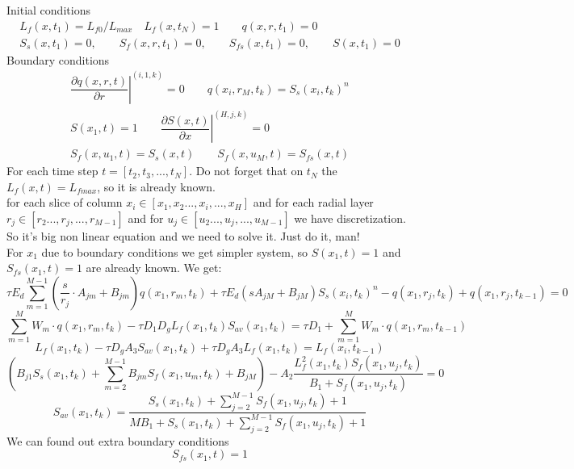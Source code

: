\documentclass[12pt]{article}
\begin{document}
Initial conditions
\begin{equation}
	\begin{array}{c}
	L_f(x, t_1) = L_{f0}/L_{max} \quad L_f(x, t_N) = 1 \qquad q(x, r, t_1) = 0\\
	S_s(x,t_1) = 0, \qquad S_f(x, r, t_1) = 0,\qquad S_{fs}(x,t_1) = 0,\qquad S(x,t_1) = 0
	\end{array}
\end{equation}
Boundary conditions
\begin{equation}
\begin{array}{c}
\left.\dfrac{\partial q(x,r,t)}{\partial r}\right\vert^{(i, 1, k)}=0 \qquad q(x_i, r_M, t_k) = S_s(x_i, t_k)^n\\
S(x_1, t) = 1 \qquad \left.\dfrac{\partial S(x,t)}{\partial x}\right\vert^{(H, j, k)}=0\\
S_f(x,u_1,t) = S_s(x, t) \qquad S_f(x,u_M,t) = S_{fs}(x, t)
\end{array}
\end{equation}
For each time step $t = [t_2, t_3, ..., t_N]$. Do not forget that on $t_N$ the $L_f(x,t)=L_{fmax}$, so it is already known.\\	
for each slice of column $x_i \in [x_1, x_2 ..., x_i, ..., x_H]$ and for each radial layer  $r_j \in [r_2 ..., r_j, ..., r_{M-1}]$ and for $u_j \in [u_2 ..., u_j, ..., u_{M-1}]$ we have discretization. So it's big non linear equation and we need to solve it. Just do it, man!\\
For $x_1$ due to boundary conditions we get simpler system, so $S(x_1, t)=1$ and $S_{fs}(x_1, t)=1$ are already known. We get:
\begin{equation}
\tau E_d\sum_{m=1}^{M-1} \left(\dfrac{s}{r_j} \cdot A_{jm} + B_{jm} \right) q(x_1,r_m,t_{k})  +\tau E_d\left(sA_{jM} + B_{jM} \right)S_s(x_i, t_k)^n - q(x_1,r_j,t_{k}) + q(x_1,r_j,t_{k-1})  = 0
\end{equation}
\begin{equation}
\sum_{m=1}^{M} W_m \cdot q(x_1,r_m,t_k)-\tau D_1D_gL_f(x_1,t_k)S_{av}(x_1, t_k) =
\tau D_1 + \sum_{m=1}^{M} W_m \cdot q(x_1,r_m,t_{k-1})
\end{equation}
\begin{equation}
L_f(x_1,t_k)-\tau D_gA_3S_{av}(x_1, t_k)+\tau D_gA_3L_f{(x_1,t_k)}=
L_f(x_i,t_{k-1})
\end{equation}
\begin{equation}
\left(B_{j1}S_s(x_1, t_k) + \sum_{m=2}^{M-1}B_{jm}S_f(x_1,u_m,t_k)+B_{jM}\right)-A_2\frac{L_f^2(x_1,t_k)S_f(x_1,u_j,t_k)}{B_1+S_f(x_1,u_j,t_k)}=0
\end{equation}
\begin{equation}
S_{av}(x_1,t_k) = 
\frac{S_s(x_1, t_k)+\sum_{j=2}^{M-1}S_f(x_1, u_j, t_k)+1}{MB_1+S_s(x_1, t_k)+\sum_{j=2}^{M-1}S_f(x_1, u_j,t_k)+1}
\end{equation}
We can found out extra boundary conditions
\begin{equation}
S_{fs}(x_1, t) = 1
\end{equation}

\end{document}
